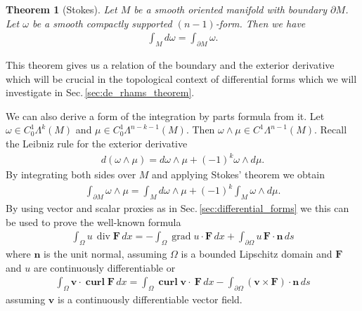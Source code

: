 \documentclass[12pt,a4paper]{article}
\numberwithin{equation}{subsection}
\numberwithin{lemma}{subsection}
\newtheorem{theorem}[lemma]{Theorem}
\theoremstyle{definition}
\DeclareMathOperator{\curl}{curl}
\DeclareMathOperator{\diver}{div}
\DeclareMathOperator{\grad}{grad}
\begin{document}
\begin{theorem}[Stokes]
    Let $M$ be a smooth oriented manifold with boundary 
    $\partial M$. Let $\omega$ be 
    a smooth compactly supported $(n-1)$-form. Then we have 
    \begin{align*}
        \int_M d\omega = \int_{\partial M} \omega.
    \end{align*}
\end{theorem}
This theorem gives us a relation of the boundary and the exterior derivative 
which will be crucial in the topological context of differential forms 
which we will investigate in Sec.\,\ref{sec:de_rhams_theorem}. 

We can also derive a form of the integration by parts formula from it. 
Let $\omega \in C_0^1 \Lambda^k (M)$ and $\mu \in C_0^1 \Lambda^{n-k-1}(M)$. 
Then $\omega \wedge \mu \in C^1 \Lambda^{n-1} (M)$. Recall the 
Leibniz rule for the exterior derivative 
\begin{align*}
    d(\omega \wedge \mu) = d\omega \wedge \mu + (-1)^k \omega \wedge d\mu. 
\end{align*}
By integrating both sides over $M$ and applying Stokes' theorem we obtain
\begin{align*}
    \int_{\partial M} \omega \wedge \mu 
    = \int_M d\omega \wedge \mu + (-1)^k \int_M \omega \wedge d\mu.
\end{align*}
By using vector and scalar proxies as in Sec.\,\ref{sec:differential_forms}
we this can be used to prove the well-known formula
\begin{align*}
    \int_\Omega u\,\diver \mathbf{F} \, dx 
    =  - \int_\Omega \grad u \cdot \mathbf{F} \, dx + 
        \int_{\partial \Omega } u \, \mathbf{F}\cdot \mathbf{n} \, ds
\end{align*}
where $\mathbf{n}$ is the unit normal, assuming $\Omega$ is a bounded Lipschitz domain
and $\mathbf{F}$ and $u$ are continuously differentiable 
or 
\begin{align*}
    \int_\Omega \mathbf{v} \cdot \mathbf{\curl} \mathbf{F} \, dx
    = \int_\Omega \mathbf{\curl} \mathbf{v} \cdot \ \mathbf{F} \, dx
        - \int_{\partial \Omega } (\mathbf{v} \times \mathbf{F})\cdot \mathbf{n} \, ds
\end{align*}
assuming $\mathbf{v}$ is a continuously differentiable vector field.
\end{document}
